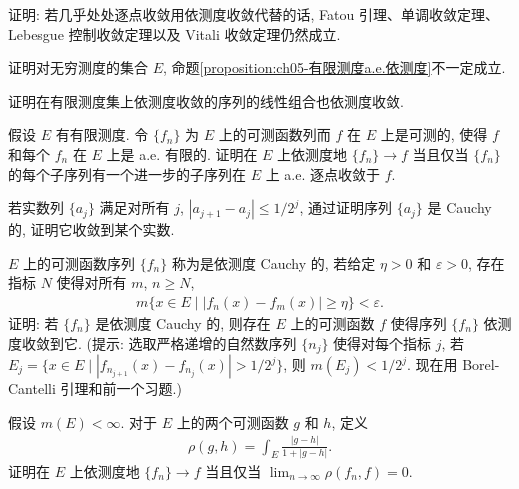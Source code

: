 \documentclass[../../main.tex]{subfiles}
\begin{document}
\begin{exercise}\label{exercise:ch05-08}
证明: 若几乎处处逐点收敛用依测度收敛代替的话, Fatou 引理、单调收敛定理、Lebesgue 控制收敛定理以及 Vitali 收敛定理仍然成立.
\end{exercise}

\begin{exercise}\label{exercise:ch05-09}
证明对无穷测度的集合 $E$, 命题\cref{proposition:ch05-有限测度a.e.依测度}不一定成立.
\end{exercise}

\begin{exercise}\label{exercise:ch05-10}
证明在有限测度集上依测度收敛的序列的线性组合也依测度收敛.
\end{exercise}

\begin{exercise}\label{exercise:ch05-11}
假设 $E$ 有有限测度. 令 $\{f_{n}\}$ 为 $E$ 上的可测函数列而 $f$ 在 $E$ 上是可测的, 使得 $f$ 和每个 $f_{n}$ 在 $E$ 上是 a.e. 有限的. 证明在 $E$ 上依测度地 $\{f_{n}\}\to f$ 当且仅当 $\{f_{n}\}$ 的每个子序列有一个进一步的子序列在 $E$ 上 a.e. 逐点收敛于 $f$.
\end{exercise}

\begin{exercise}\label{exercise:ch05-12}
若实数列 $\{a_{j}\}$ 满足对所有 $j$, $|a_{j+1}-a_{j}|\leqslant 1/2^{j}$, 通过证明序列 $\{a_{j}\}$ 是 Cauchy 的, 证明它收敛到某个实数.
\end{exercise}

\begin{exercise}\label{exercise:ch05-13}
$E$ 上的可测函数序列 $\{f_{n}\}$ 称为是依测度 Cauchy 的, 若给定 $\eta>0$ 和 $\varepsilon>0$, 存在指标 $N$ 使得对所有 $m$, $n\geqslant N$,
\begin{align*}
m\{x\in E\mid|f_{n}(x)-f_{m}(x)|\geqslant\eta\}<\varepsilon.
\end{align*}
证明: 若 $\{f_{n}\}$ 是依测度 Cauchy 的, 则存在 $E$ 上的可测函数 $f$ 使得序列 $\{f_{n}\}$ 依测度收敛到它. (提示: 选取严格递增的自然数序列 $\{n_{j}\}$ 使得对每个指标 $j$, 若 $E_{j}=\{x\in E\mid|f_{n_{j+1}}(x)-f_{n_{j}}(x)|>1/2^{j}\}$, 则 $m(E_{j})<1/2^{j}$. 现在用 Borel-Cantelli 引理和前一个习题.)
\end{exercise}

\begin{exercise}\label{exercise:ch05-14}
假设 $m(E)<\infty$. 对于 $E$ 上的两个可测函数 $g$ 和 $h$, 定义
\begin{align*}
\rho(g,h)=\int_{E}\frac{|g-h|}{1+|g-h|}.
\end{align*}
证明在 $E$ 上依测度地 $\{f_{n}\}\to f$ 当且仅当 $\lim_{n\to\infty}\rho(f_{n},f)=0$.
\end{exercise}
\end{document}
